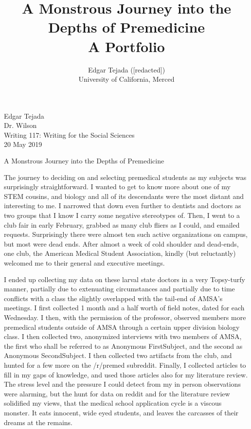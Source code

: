 \documentclass [12pt]{article}
\title{A Monstrous Journey into the Depths of Premedicine\\\medskip A Portfolio}
\author{Edgar Tejada ([redacted])\\University of California, Merced}
\begin{document}
\begin{flushleft}
Edgar Tejada\\
Dr. Wilson\\
Writing 117: Writing for the Social Sciences\\
20 May 2019\\


\begin{center}
	A Monstrous Journey into the Depths of Premedicine\\
\end{center}


\setlength{\parindent}{0.5in}
The journey to deciding on and selecting premedical students as my subjects was surprisingly straightforward. I wanted to get to know more about one of my STEM cousins, and biology and all of its descendants were the most distant and interesting to me. I narrowed that down even further to dentists and doctors as two groups that I know I carry some negative stereotypes of. Then, I went to a club fair in early February, grabbed as many club fliers as I could, and emailed requests. Surprisingly there were almost ten such active organizations on campus, but most were dead ends. After almost a week of cold shoulder and dead-ends, one club, the American Medical Student Association, kindly (but reluctantly) welcomed me to their general and executive meetings.

I ended up collecting my data on these larval state doctors in a very Topsy-turfy manner, partially due to extenuating circumstances and partially due to time conflicts with a class the slightly overlapped with the tail-end of AMSA's meetings. I first collected 1 month and a half worth of field notes, dated for each Wednesday. I then, with the permission of the professor, observed members more premedical students outside of AMSA through a certain upper division biology class. I then collected two, anonymized interviews with two members of AMSA, the first who shall be referred to as Anonymous FirstSubject, and the second as Anonymous SecondSubject. I then collected two artifacts from the club, and hunted for a few more on the /r/premed subreddit. Finally, I collected articles to fill in my gaps of knowledge, and used those articles also for my literature review. The stress level and the pressure I could detect from my in person observations were alarming, but the hunt for data on reddit and for the literature review solidified my views, that the medical school application cycle is a viscous monster. It eats innocent, wide eyed students, and leaves the carcasses of their dreams at the remains.



\newpage
\medskip %
\nocite{*} %
\printbibliography%

\end{flushleft}
\end{document}
